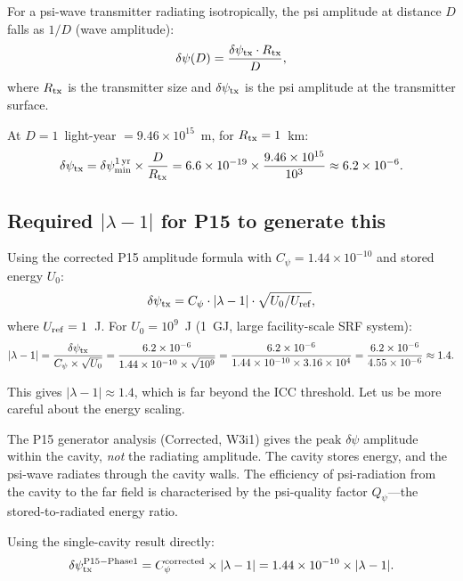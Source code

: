 \documentclass[11pt]{article}
\newcommand{\ee}[1]{\times 10^{#1}}
\begin{document}
For a psi-wave transmitter radiating isotropically, the psi
amplitude at distance $D$ falls as $1/D$ (wave amplitude):
\begin{equation}
\delta\psi(D) = \frac{\delta\psi_{\rm tx} \cdot R_{\rm tx}}{D},
\end{equation}
where $R_{\rm tx}$ is the transmitter size and $\delta\psi_{\rm tx}$
is the psi amplitude at the transmitter surface.

At $D = 1$~light-year $= 9.46\ee{15}$~m, for $R_{\rm tx} = 1$~km:
\begin{equation}
\delta\psi_{\rm tx} = \delta\psi_{\rm min}^{\rm 1\,yr} \times \frac{D}{R_{\rm tx}}
= 6.6\ee{-19} \times \frac{9.46\ee{15}}{10^3} \approx 6.2\ee{-6}.
\end{equation}

\subsection{Required $|\lambda-1|$ for P15 to generate this}

Using the corrected P15 amplitude formula with $C_\psi = 1.44\ee{-10}$
and stored energy $U_0$:
\begin{equation}
\delta\psi_{\rm tx} = C_\psi \cdot |\lambda-1| \cdot \sqrt{U_0/U_{\rm ref}},
\end{equation}
where $U_{\rm ref} = 1$~J. For $U_0 = 10^9$~J (1~GJ, large
facility-scale SRF system):
\begin{equation}
|\lambda-1| = \frac{\delta\psi_{\rm tx}}{C_\psi \times \sqrt{U_0}}
= \frac{6.2\ee{-6}}{1.44\ee{-10} \times \sqrt{10^9}}
= \frac{6.2\ee{-6}}{1.44\ee{-10} \times 3.16\ee{4}}
= \frac{6.2\ee{-6}}{4.55\ee{-6}} \approx 1.4.
\end{equation}

This gives $|\lambda-1| \approx 1.4$, which is far beyond the
ICC threshold. Let us be more careful about the energy scaling.

The P15 generator analysis (Corrected, W3i1) gives the peak
$\delta\psi$ amplitude within the cavity, \textit{not} the
radiating amplitude. The cavity stores energy, and the psi-wave
radiates through the cavity walls. The efficiency of psi-radiation
from the cavity to the far field is characterised by the
psi-quality factor $Q_\psi$---the stored-to-radiated energy ratio.

Using the single-cavity result directly:
\begin{equation}
\delta\psi_{\rm tx}^{\rm P15-Phase1} = C_\psi^{\rm corrected} \times |\lambda-1|
= 1.44\ee{-10} \times |\lambda-1|.
\end{equation}
\end{document}
